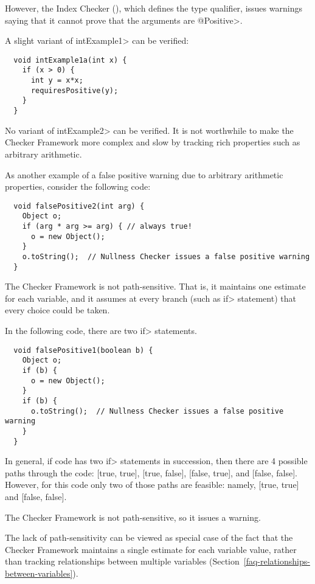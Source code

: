\noindent
However, the Index Checker (), which defines the
 type qualifier, issues warnings
saying that it cannot prove that the arguments are \<@Positive>.

A slight variant of \<intExample1> can be verified:

\begin{Verbatim}
  void intExample1a(int x) {
    if (x > 0) {
      int y = x*x;
      requiresPositive(y);
    }
  }
\end{Verbatim}

\noindent
No variant of \<intExample2> can be verified.  It is not worthwhile to make
the Checker Framework more complex and slow by tracking rich properties
such as arbitrary arithmetic.

As another example of a false positive warning due to arbitrary arithmetic
properties, consider the following code:

\begin{Verbatim}
  void falsePositive2(int arg) {
    Object o;
    if (arg * arg >= arg) { // always true!
      o = new Object();
    }
    o.toString();  // Nullness Checker issues a false positive warning
  }
\end{Verbatim}



The Checker Framework is not path-sensitive.  That is, it maintains one
estimate for each variable, and it assumes at every branch (such as \<if>
statement) that every choice could be taken.

In the following code, there are two \<if> statements.

\begin{Verbatim}
  void falsePositive1(boolean b) {
    Object o;
    if (b) {
      o = new Object();
    }
    if (b) {
      o.toString();  // Nullness Checker issues a false positive warning
    }
  }
\end{Verbatim}

In general, if code has two \<if> statements in succession, then there are
4 possible paths through the code:  [true, true], [true, false], [false,
  true], and [false, false].  However, for this code only two of those
paths are feasible:  namely, [true, true] and [false, false].

The Checker Framework is not path-sensitive, so it issues a warning.

The lack of path-sensitivity can be viewed as special case of the fact that
the Checker Framework maintains a single estimate for each variable value,
rather than tracking relationships between multiple variables
(Section~\ref{faq-relationships-between-variables}).

